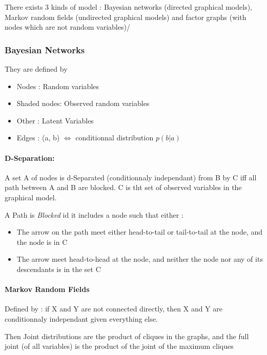 		There exists 3 kinds of model : Bayesian networks (directed graphical models), Markov random fields (undirected graphical models) and factor graphs (with nodes which are not random variables)/

		\subsubsection{Bayesian Networks}


			They are defined by 
			\begin{itemize}
				\item Nodes : Random variables
				\item Shaded nodes: Observed random variables
				\item Other : Latent Variables
				\item Edges : (a, b) $\iff$ conditionnal distribution $p(b|a)$
			\end{itemize}


			\paragraph*{D-Separation:} A set A of nodes is d-Separated (conditionnaly independant) from B by C iff all path between A and B are blocked. C is tht set of observed variables in the graphical model.
			\begin{definition}
				A Path is \emph{Blocked} id it includes a node such that either :
				\begin{itemize}
					\item The arrow on the path meet either head-to-tail or tail-to-tail at the node, and the node is in C 
					\item The arrow meet head-to-head at the node, and neither the node nor any of its descendants is in the set C
				\end{itemize}
			\end{definition}

			\paragraph*{Markov Random Fields}
				Defined by : if X and Y are not connected directly, then X and Y are conditionnaly independant given everything else.

				Then Joint distributions are the product of cliques in the graphs, and the full joint (of all variables) is the product of the joint of the maximum cliques

